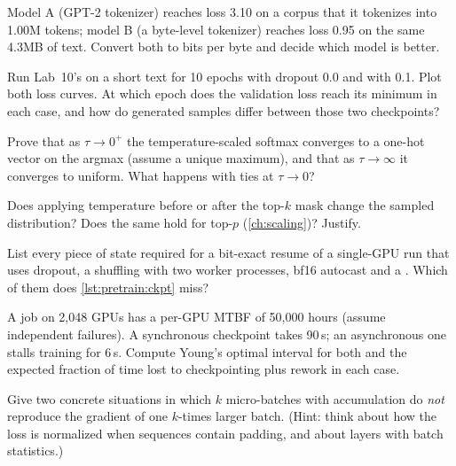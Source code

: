 \begin{exercise}
Model A (GPT-2 tokenizer) reaches loss 3.10 on a corpus that it tokenizes into 1.00M tokens;
model B (a byte-level tokenizer) reaches loss 0.95 on the same 4.3MB of text. Convert both to
bits per byte and decide which model is better.
\end{exercise}

\begin{exercise}
Run Lab~10's  on a short text for 10 epochs with dropout 0.0 and with 0.1.
Plot both loss curves. At which epoch does the validation loss reach its minimum in each case,
and how do generated samples differ between those two checkpoints?
\end{exercise}

\begin{exercise}
Prove that as $\tau\to0^+$ the temperature-scaled softmax converges to a one-hot vector on the
argmax (assume a unique maximum), and that as $\tau\to\infty$ it converges to uniform. What
happens with ties at $\tau\to0$?
\end{exercise}

\begin{exercise}
Does applying temperature before or after the top-$k$ mask change the sampled distribution?
Does the same hold for top-$p$ (\cref{ch:scaling})? Justify.
\end{exercise}

\begin{exercise}
List every piece of state required for a bit-exact resume of a single-GPU run that uses
dropout, a shuffling  with two worker processes, bf16 autocast and a
. Which of them does \cref{lst:pretrain:ckpt} miss?
\end{exercise}

\begin{exercise}
A job on 2{,}048 GPUs has a per-GPU MTBF of 50{,}000 hours (assume independent failures). A
synchronous checkpoint takes 90\,s; an asynchronous one stalls training for 6\,s. Compute
Young's optimal interval for both and the expected fraction of time lost to checkpointing plus
rework in each case.
\end{exercise}

\begin{exercise}
Give two concrete situations in which $k$ micro-batches with accumulation do \emph{not}
reproduce the gradient of one $k$-times larger batch. (Hint: think about how the loss is
normalized when sequences contain padding, and about layers with batch statistics.)
\end{exercise}

